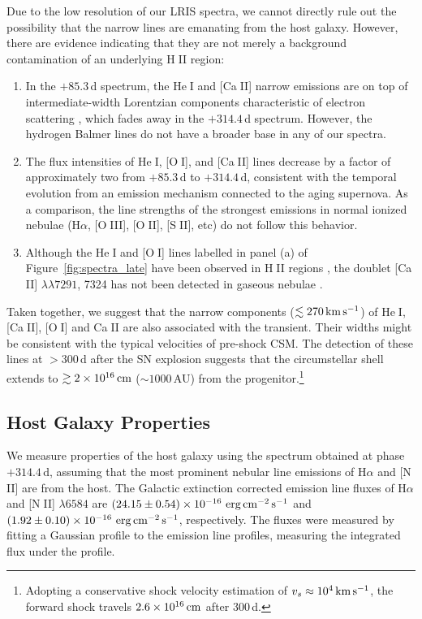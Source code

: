 \documentclass[twocolumn]{aastex63}
\def\ion#1#2{#1$\;${\footnotesize\rm{#2}}\relax}
\begin{document}
\begin{CJK*}{UTF8}{gbsn}
Due to the low resolution of our LRIS spectra, we cannot directly rule out the possibility that the 
narrow lines are emanating from the host galaxy. However, there are evidence indicating that they are 
not merely a background contamination of an underlying \ion{H}{II} region: 
\begin{enumerate}[label=(\roman*)]
	\item In the $+85.3$\,d spectrum, the \ion{He}{I} and [\ion{Ca}{II}] narrow emissions are on top of 
	intermediate-width Lorentzian components characteristic of electron scattering \citep{Huang2018}, 
	which fades away in the $+314.4$\,d spectrum. However, the hydrogen Balmer lines do not have a 
	broader base in any of our spectra.
	\item The flux intensities of \ion{He}{I}, [\ion{O}{I}], and [\ion{Ca}{II}] lines decrease by a 
	factor of approximately two from $+85.3$\,d to $+314.4$\,d, consistent with the temporal 
	evolution from an emission mechanism connected to the aging supernova. As a comparison, the line 
	strengths  of the strongest emissions in normal ionized nebulae (H$\alpha$, [\ion{O}{III}], 
	[\ion{O}{II}], [\ion{S}{II}], etc) do not follow this behavior.
\item Although the \ion{He}{I} and [\ion{O}{I}] lines labelled in panel (a) of Figure~\ref{fig:spectra_late} 
have been observed in \ion{H}{II} regions \citep{Peimbert2000, Peimbert2017}, the doublet [\ion{Ca}{II}] 
$\lambda \lambda 7291$, 7324 has not been detected in gaseous nebulae \citep{Kingdon1995}.
\end{enumerate}

Taken together, we suggest that the narrow components ($\lesssim 270\,{\rm km\,s^{-1}}$) of 
\ion{He}{I}, [\ion{Ca}{II}], [\ion{O}{I}] and \ion{Ca}{II} are also associated with the transient. Their widths 
might be consistent with the typical velocities of pre-shock CSM. The detection of these lines at 
$>300$\,d after the SN explosion suggests that the circumstellar shell extends to $\gtrsim 2\times 
10^{16}\,{\rm cm}$ ($\sim 1000$\,AU) from the progenitor.\footnote{Adopting a conservative shock 
velocity estimation of 
	$v_s\approx10^4\,{\rm km\,s^{-1}}$, the forward shock travels $2.6\times 10^{16}\,{\rm cm}$ after 
	300\,d.}

\subsection{Host Galaxy Properties} \label{subsec:host}
We measure properties of the host galaxy using the spectrum obtained at phase $+314.4$\,d, 
assuming that the most prominent nebular line emissions of H$\alpha$ and [\ion{N}{II}] 
are from the host. The Galactic extinction corrected emission line fluxes of H$\alpha$ and [\ion{N}{II}] 
$\lambda6584$ are $(24.15 \pm 0.54) \times 10^{-16}~{\rm erg\,cm}^{-2}\,{\rm s}^{-1}$ and $(1.92 \pm 
0.10 ) \times 10^{-16}~{\rm erg\,cm}^{-2}\,{\rm s}^{-1}$, respectively. The fluxes were 
measured by fitting a Gaussian profile to the emission line profiles, 
measuring the integrated flux under the profile.


\end{CJK*}
\end{document}
